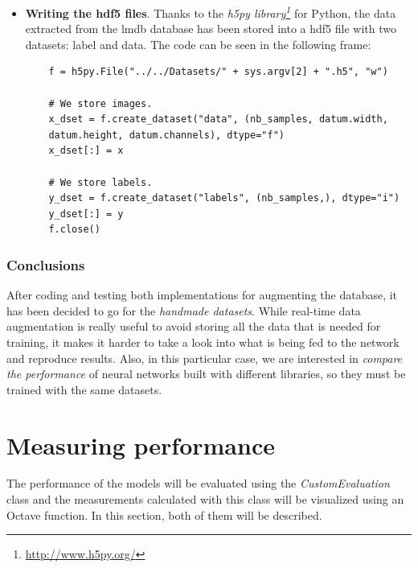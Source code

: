 \begin{itemize}
\begin{lstlisting}
		x.append(im)
		y.append(label)
		nb_samples += 1
		
		print("Extracted samples: " + str(nb_samples) + "\n")
	
	x = np.asarray(x)
	y = np.asarray(y)
\end{lstlisting}
	
	\item \textbf{Writing the \gls{hdf5} files}. Thanks to the \emph{h5py library\footnote{\url{http://www.h5py.org/}}} for Python, the data extracted from the \gls{lmdb} database has been stored into a \gls{hdf5} file with two datasets: label and data. The code can be seen in the following frame:	 
	\begin{lstlisting}
	f = h5py.File("../../Datasets/" + sys.argv[2] + ".h5", "w")
	
	# We store images.
	x_dset = f.create_dataset("data", (nb_samples, datum.width,
	datum.height, datum.channels), dtype="f")
	x_dset[:] = x
	
	# We store labels.
	y_dset = f.create_dataset("labels", (nb_samples,), dtype="i")
	y_dset[:] = y
	f.close()
	\end{lstlisting}
\end{itemize} 

\subsubsection{Conclusions}
After coding and testing both implementations for augmenting the database, it has been decided to go for the \emph{handmade datasets}. While real-time data augmentation is really useful to avoid storing all the data that is needed for training, it makes it harder to take a look into what is being fed to the network and reproduce results. Also, in this particular case, we are interested in \emph{compare the performance} of neural networks built with different libraries, so they must be trained with the same datasets.

\section{Measuring performance}\label{sec:measuring}
The performance of the models will be evaluated using the \textit{CustomEvaluation} class and the measurements calculated with this class will be visualized using an Octave function. In this section, both of them will be described.

